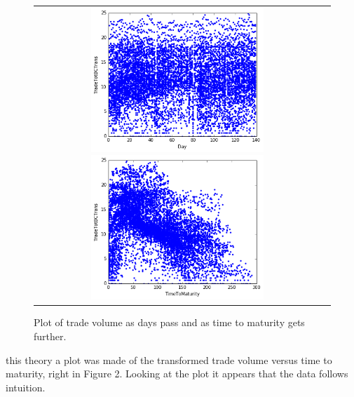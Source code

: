\documentclass[12pt]{article}
\begin{document}
\begin{figure}[H]
	\begin{center}
		\begin{tabular}{cc}
			\includegraphics[width=6.5cm]{bc_sample_day_wMat.png}
			\includegraphics[width=6.5cm]{time_to_mat.png}
		\end{tabular}
		\caption{Plot of trade volume as days pass and as time to maturity gets further.}
		\label{fig:1}
	\end{center}
\end{figure}

\noindent this theory a plot was made of the transformed trade volume versus time to maturity, right in Figure 2. Looking at the plot it appears that the data follows intuition. 
 
\end{document}
